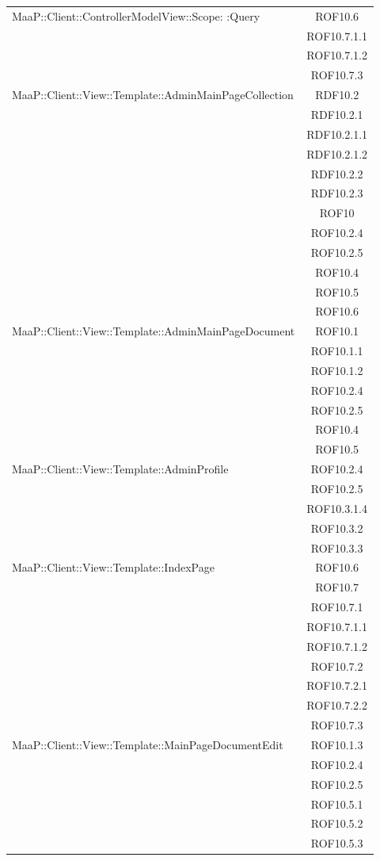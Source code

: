 \begin{center}
\begin{longtable}{|p{0.8\linewidth}|c|}
\midrule
MaaP::Client::ControllerModelView::Scope: :Query
& ROF10.6\\
& ROF10.7.1.1\\
& ROF10.7.1.2\\
& ROF10.7.3\\

\midrule
MaaP::Client::View::Template::AdminMainPageCollection
& RDF10.2\\
& RDF10.2.1\\
& RDF10.2.1.1\\
& RDF10.2.1.2\\
& RDF10.2.2\\
& RDF10.2.3\\
& ROF10\\
& ROF10.2.4\\
& ROF10.2.5\\
& ROF10.4\\
& ROF10.5\\
& ROF10.6\\

\midrule
MaaP::Client::View::Template::AdminMainPageDocument
& ROF10.1\\
& ROF10.1.1\\
& ROF10.1.2\\
& ROF10.2.4\\
& ROF10.2.5\\
& ROF10.4\\
& ROF10.5\\

\midrule
MaaP::Client::View::Template::AdminProfile
& ROF10.2.4\\
& ROF10.2.5\\
& ROF10.3.1.4\\
& ROF10.3.2\\
& ROF10.3.3\\

\midrule
MaaP::Client::View::Template::IndexPage
& ROF10.6\\
& ROF10.7\\
& ROF10.7.1\\
& ROF10.7.1.1\\
& ROF10.7.1.2\\
& ROF10.7.2\\
& ROF10.7.2.1\\
& ROF10.7.2.2\\
& ROF10.7.3\\

\midrule
MaaP::Client::View::Template::MainPageDocumentEdit
& ROF10.1.3\\
& ROF10.2.4\\
& ROF10.2.5\\
& ROF10.5.1\\
& ROF10.5.2\\
& ROF10.5.3\\


\end{longtable}
\end{center}
